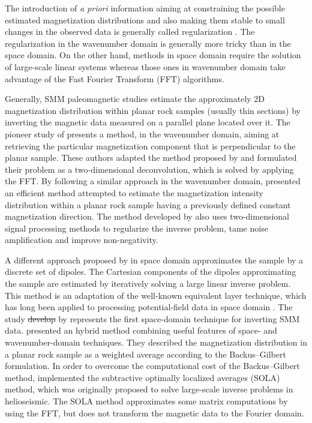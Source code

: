 \documentclass[draft,gc]{agutex}
\providecommand{\DIFadd}[1]{{\protect\color{blue}\uwave{#1}}} %
\providecommand{\DIFdel}[1]{{\protect\color{red}\sout{#1}}}                      %
\providecommand{\DIFaddbegin}{} %
\providecommand{\DIFaddend}{} %
\providecommand{\DIFdelbegin}{} %
\providecommand{\DIFdelend}{} %
\begin{document}
\begin{article}
\DIFdelend The introduction of \textit{a priori} information aiming at constraining 
the possible estimated magnetization distributions and also 
making them stable to small changes in the observed data is
generally called regularization \citep{tikhonov1977, engl1996, 
aster2005}.
The regularization in the wavenumber domain is generally more
tricky than in the space domain.
On the other hand, methods in space domain require the solution
of large-scale linear systems whereas those ones in wavenumber
domain take advantage of the Fast Fourier Transform (FFT)
algorithms.

Generally, SMM paleomagnetic studies estimate the approximately 2D magnetization 
distribution within planar rock samples (usually thin sections) 
by inverting the magnetic data measured on a parallel plane
located over it.
The pioneer study of \citet{egli2000} presents a method, in the 
wavenumber domain, aiming at retrieving the particular magnetization 
component that is perpendicular to the planar sample.
These authors adapted the method proposed by \citet{mareschal1985}
and formulated their problem as a two-dimensional 
deconvolution, which is solved by applying the FFT.
By following a similar approach in the wavenumber domain, 
\citet{lima2013} presented an efficient method attempted 
to estimate the magnetization intensity distribution 
within a planar rock sample having a previously defined 
constant magnetization direction.
The method developed by \citet{lima2013} also uses
two-dimensional signal processing methods to regularize the 
inverse problem, tame noise amplification and improve 
non-negativity.
\DIFaddbegin 

\DIFaddend A different approach proposed by \citep{weiss2007} in space domain
approximates the sample by a discrete set of dipoles.
The Cartesian components of the dipoles approximating the sample
are estimated by iteratively solving a large linear inverse problem.
This method is an adaptation of the well-known equivalent
layer technique, which has long been applied to processing
potential-field data in space domain \citep{dampney1969, emilia1973, 
vonfrese-etal1981, hansen-miyazaki1984, silva1986, leao-silva1989, 
cordell1992, mendonca1992, mendonca-silva1994, mendonca-silva1995,
guspi-novara2009, li-oldenburg2010, barnes-lumley2011, 
oliveirajr-etal2013, kara-etal2014, li-nabighian-oldenburg2014,
barnes2014}.
The study \DIFdelbegin \DIFdel{develop }\DIFdelend \DIFaddbegin \DIFadd{developed }\DIFaddend by \citep{weiss2007} represents the first
space-domain technique for inverting SMM data.
\citet{usui2012} presented an hybrid method combining
useful features of space- and wavenumber-domain techniques.
They described the magnetization distribution in a planar
rock sample as a weighted average according to the 
Backus–Gilbert formulation.
In order to overcome the computational cost of the 
Backus–Gilbert method, \citet{usui2012} implemented 
the subtractive optimally localized averages (SOLA) 
method, which was originally proposed to solve
large-scale inverse problems in helioseismic.
The SOLA method approximates some matrix computations 
by using the FFT, but does not transform the magnetic 
data to the Fourier domain.


\end{article}
\end{document}
